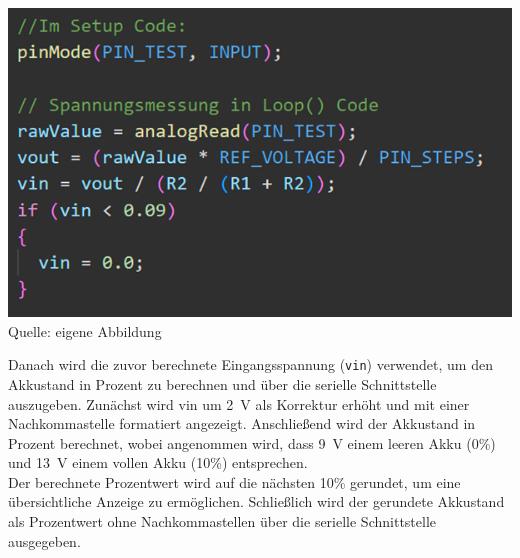 \documentclass[ngerman,12pt,a4paper]{article}
\begin{document}
	 	\begin{center}
	 		\begin{minipage}{1\textwidth}
	 			\centering
	 			\includegraphics[width=\textwidth]{Pictures/code_spannungsmessung}
	 			\label{fig:code_spannungsmessung}
	 			\vspace{-3pt}
	 			{\small Quelle: {eigene Abbildung}}
	 			\vspace{1cm}
	 		\end{minipage}
	 	\end{center}
	 	\noindent 
	 	Danach wird die zuvor berechnete Eingangsspannung
	 	(\texttt{vin}) verwendet, um den Akkustand in Prozent zu berechnen und über die serielle Schnittstelle auszugeben. Zunächst wird vin um 2~V als Korrektur erhöht und mit einer Nachkommastelle formatiert angezeigt. Anschließend wird der Akkustand in Prozent berechnet, wobei angenommen wird, dass 9~V einem leeren Akku (0\%) und 13~V einem vollen Akku (10\%) entsprechen.\\
	 	Der berechnete Prozentwert wird auf die nächsten 10\% gerundet, um eine übersichtliche Anzeige zu ermöglichen. Schließlich wird der gerundete Akkustand als Prozentwert ohne Nachkommastellen über die serielle Schnittstelle ausgegeben.
	 	
\end{document}
